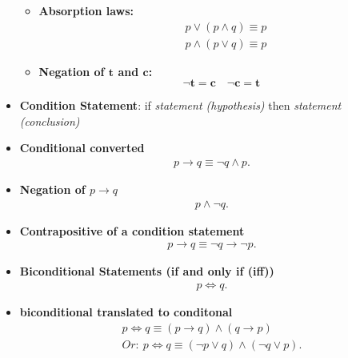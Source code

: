 \documentclass{report}
\begin{document}
\begin{itemize}
\begin{itemize}
    \item \textbf{Absorption laws:}
    \begin{align*}
        & p \lor (p \land q) \equiv p \\
        & p \land (p \lor q) \equiv p
    \end{align*}
    
    \item \textbf{Negation of $\mathbf{t}$ and $\mathbf{c}$:}
    \[
    \neg \mathbf{t} = \mathbf{c} \quad \neg \mathbf{c} = \mathbf{t}
    \]
        \end{itemize}
        \bigbreak \noindent 
      \item \textbf{Condition Statement}: if \textit{statement (hypothesis)} then \textit{statement (conclusion)}
      \bigbreak \noindent 
    \item \textbf{Conditional converted }
      \begin{align*}
        p \rightarrow q \equiv \neg q \land p 
      .\end{align*}
      \item \textbf{Negation of $p \rightarrow q$}
        \begin{align*}
          p \land \neg q
        .\end{align*}
      \item \textbf{Contrapositive of a condition statement}
        \begin{align*}
          p \rightarrow q \equiv \neg q \rightarrow \neg p
        .\end{align*}
      \item \textbf{Biconditional Statements (if and only if (iff))}
        \begin{align*}
          p \iff q
        .\end{align*}
        \bigbreak \noindent 
        \bigbreak \noindent 
      \item \textbf{biconditional translated to conditonal}
        \begin{align*}
          p \iff q \equiv (p \rightarrow q) \land (q \rightarrow p) \\
          Or:\ p \iff q \equiv (\neg p \lor q) \land (\neg q \lor p)
        .\end{align*}
    \end{itemize}
\end{document}

